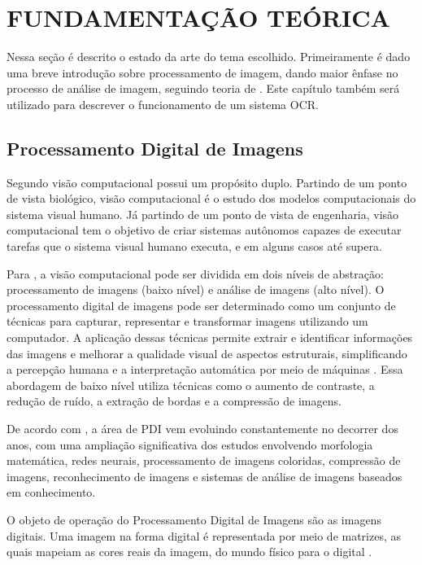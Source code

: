 
\chapter{FUNDAMENTAÇÃO TEÓRICA} \label{cap:funda}

Nessa seção é descrito o estado da arte do tema escolhido. Primeiramente é dado uma breve introdução sobre processamento de imagem, dando maior ênfase no processo de análise de imagem, seguindo teoria de . Este capítulo também será utilizado para descrever o funcionamento de um sistema OCR.

\section{Processamento Digital de Imagens}


Segundo  visão computacional possui um propósito duplo. Partindo de um ponto de vista biológico, visão computacional é o estudo dos modelos computacionais do sistema visual humano. Já partindo de um ponto de vista de engenharia, visão computacional tem o objetivo de criar sistemas autônomos capazes de executar tarefas que o sistema visual humano executa, e em alguns casos até supera.


Para , a visão computacional pode ser dividida em dois níveis de abstração: processamento de imagens (baixo nível) e análise de imagens (alto nível). O processamento digital de imagens pode ser determinado como um conjunto de técnicas para capturar, representar e transformar imagens utilizando um computador. A aplicação dessas técnicas permite extrair e identificar informações das imagens e melhorar a qualidade visual de aspectos estruturais, simplificando a percepção humana e a interpretação automática por meio de máquinas \cite{PEDRINI2008}. Essa abordagem de baixo nível utiliza técnicas como o aumento de contraste, a redução de ruído, a extração de bordas e a compressão de imagens.

De acordo com , a área de PDI vem evoluindo constantemente no decorrer dos anos, com uma ampliação significativa dos estudos envolvendo morfologia matemática, redes neurais, processamento de imagens coloridas, compressão de imagens, reconhecimento de imagens e sistemas de análise de imagens baseados em conhecimento.


O objeto de operação do Processamento Digital de Imagens são as imagens digitais. Uma imagem na forma digital é representada por meio de matrizes, as quais mapeiam as cores reais da imagem, do mundo físico para o digital \cite{Almeida2018}.





